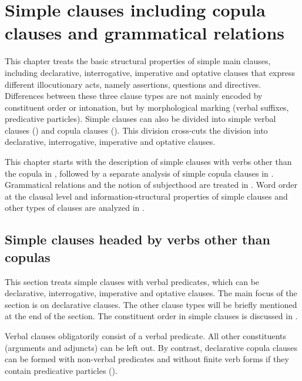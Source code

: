 \chapter{Simple clauses including copula clauses and grammatical relations}
\label{cpt:Simpleclauses}

This chapter treats the basic structural properties of simple main clauses, including declarative, interrogative, imperative and optative clauses that express different illocutionary acts, namely assertions, questions and directives. Differences between these three clause types are not mainly encoded by constituent order or intonation, but by morphological marking (verbal suffixes, predicative particles). Simple clauses can also be divided into simple verbal clauses () and copula clauses (). This division cross-cuts the division into declarative, interrogative, imperative and optative clauses. 

This chapter starts with the description of simple clauses with verbs other than the copula in , followed by a separate analysis of simple copula clauses in . Grammatical relations and the notion of subjecthood are treated in . Word order at the clausal level and information-structural properties of simple clauses and other types of clauses are analyzed in . 



\section{Simple clauses headed by verbs other than copulas}
\label{sec:Simple clauses headed by verbs other than copulae}

This section treats simple clauses with verbal predicates, which can be declarative, interrogative, imperative and optative clauses. The main focus of the section is on declarative clauses. The other clause types will be briefly mentioned at the end of the section. The constituent order in simple clauses is discussed in .

Verbal clauses obligatorily consist of a verbal predicate. All other constituents (arguments and adjuncts) can be left out. By contrast, declarative copula clauses can be formed with non-verbal predicates and without finite verb forms if they contain predicative particles ().  

